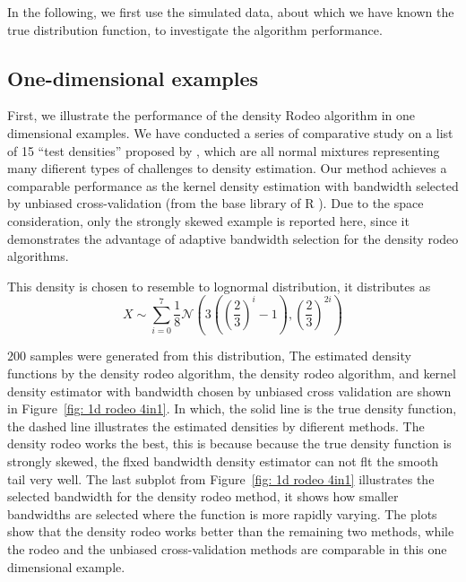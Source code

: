 In the following, we first use the simulated data, about which we have known the true distribution function, to investigate the algorithm performance. 

\subsection{One-dimensional examples}
First, we illustrate the performance of the density Rodeo algorithm in one dimensional examples. 
We have conducted a series of comparative study on a list of 15 ``test densities'' proposed by \cite{marron1992exact}, which are all normal mixtures representing many difierent types of challenges to density estimation. Our method achieves a comparable performance as the kernel density estimation with bandwidth selected by unbiased cross-validation (from the base library of R ). 
Due to the space consideration, only the strongly skewed example is reported here, since it demonstrates the advantage of adaptive bandwidth selection for the density rodeo algorithms. 

\begin{example}
    This density is chosen to resemble to lognormal distribution, it distributes as 
    \begin{equation}
        X \sim \sum_{i=0}^{7} \frac{1}{8} \mathcal{N}\left(3\left(\left(\frac{2}{3}\right)^{i}-1\right),\left(\frac{2}{3}\right)^{2 i}\right)
    \end{equation}
\end{example}
$200$ samples were generated from this distribution, The estimated density functions by the density rodeo algorithm, the density rodeo algorithm, and kernel density estimator with bandwidth chosen by unbiased cross validation are shown in Figure~\ref{fig: 1d rodeo 4in1}. 
In which, the solid line is the true density function, the dashed line illustrates the estimated densities by difierent methods. 
The density rodeo works the best, this is because because the true density function is strongly skewed, the flxed bandwidth density estimator can not flt the smooth tail very well. 
The last subplot from Figure~\ref{fig: 1d rodeo 4in1} illustrates the selected bandwidth for the density rodeo method, it shows how smaller bandwidths are selected where the function is more rapidly varying. 
The plots show that the density rodeo works better than the remaining two methods, while the rodeo and the unbiased cross-validation methods are comparable in this one dimensional example. 

